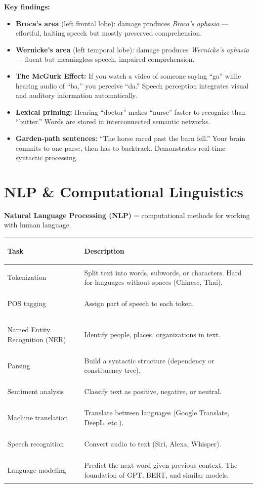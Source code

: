 \documentclass[11pt, letterpaper]{article}
\begin{document}
\textbf{Key findings:}
\begin{itemize}[noitemsep]
  \item \textbf{Broca's area} (left frontal lobe): damage produces \emph{Broca's aphasia} --- effortful, halting speech but mostly preserved comprehension.
  \item \textbf{Wernicke's area} (left temporal lobe): damage produces \emph{Wernicke's aphasia} --- fluent but meaningless speech, impaired comprehension.
  \item \textbf{The McGurk Effect:} If you watch a video of someone saying ``ga'' while hearing audio of ``ba,'' you perceive ``da.'' Speech perception integrates visual and auditory information automatically.
  \item \textbf{Lexical priming:} Hearing ``doctor'' makes ``nurse'' faster to recognize than ``butter.'' Words are stored in interconnected semantic networks.
  \item \textbf{Garden-path sentences:} ``The horse raced past the barn fell.'' Your brain commits to one parse, then has to backtrack. Demonstrates real-time syntactic processing.
\end{itemize}

\section*{NLP \& Computational Linguistics}

\textbf{Natural Language Processing (NLP)} = computational methods for working with human language.

\noindent
{\renewcommand{\arraystretch}{1.5}
\begin{tabularx}{\textwidth}{>{\bfseries\raggedright\arraybackslash}p{4cm}
                              >{\raggedright\arraybackslash}X}
\toprule
\rowcolor{tableheadergreen}
\textbf{Task} & \textbf{Description} \\
\midrule
\rowcolor{rowA}  Tokenization        & Split text into words, subwords, or characters. Hard for languages without spaces (Chinese, Thai). \\
\rowcolor{rowBg} POS tagging         & Assign part of speech to each token. \\
\rowcolor{rowA}  Named Entity Recognition (NER) & Identify people, places, organizations in text. \\
\rowcolor{rowBg} Parsing             & Build a syntactic structure (dependency or constituency tree). \\
\rowcolor{rowA}  Sentiment analysis  & Classify text as positive, negative, or neutral. \\
\rowcolor{rowBg} Machine translation & Translate between languages (Google Translate, DeepL, etc.). \\
\rowcolor{rowA}  Speech recognition  & Convert audio to text (Siri, Alexa, Whisper). \\
\rowcolor{rowBg} Language modeling   & Predict the next word given previous context. The foundation of GPT, BERT, and similar models. \\
\bottomrule
\end{tabularx}}
\end{document}
